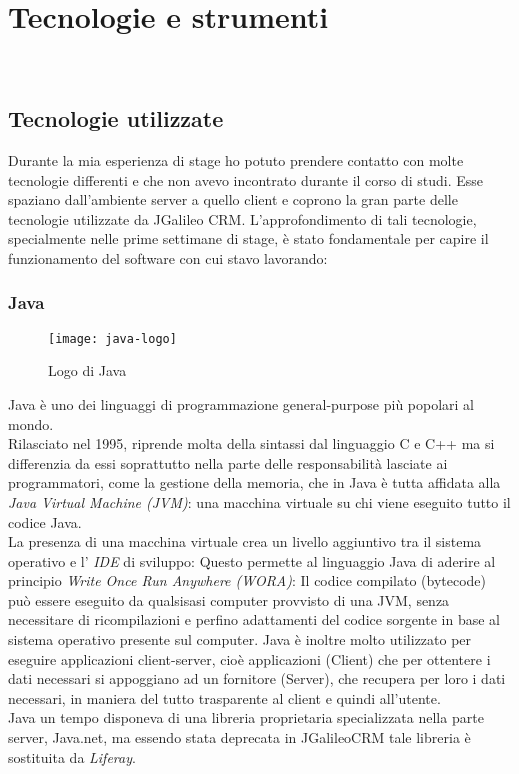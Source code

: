 \chapter{Tecnologie e strumenti}
\label{cap:tecnologie-strumenti}

\\

\section{Tecnologie utilizzate}
Durante la mia esperienza di stage ho potuto prendere contatto con molte tecnologie differenti e che non avevo incontrato durante il corso di studi. Esse spaziano dall'ambiente server a quello client e coprono la gran parte delle tecnologie utilizzate da JGalileo CRM. L'approfondimento di tali tecnologie, specialmente nelle prime settimane di stage, è stato fondamentale per capire il funzionamento del software con cui stavo lavorando: \\
\subsection{Java}
\begin{figure}[h]
	\centering
	\texttt{[image: java-logo]}
	\caption{Logo di Java}
\end{figure}
Java è uno dei linguaggi di programmazione general-purpose più popolari al mondo. \\
Rilasciato nel 1995, riprende molta della sintassi dal linguaggio C e C++ ma si differenzia da essi soprattutto  nella parte delle responsabilità lasciate ai programmatori, come la gestione della memoria, che in Java è tutta affidata alla \emph{Java Virtual Machine (JVM)}: una macchina virtuale su chi viene eseguito tutto il codice Java.\\
La presenza di una macchina virtuale crea un livello aggiuntivo tra il sistema operativo e l' \emph{IDE} di sviluppo: Questo permette al linguaggio Java di aderire al principio \emph{Write Once Run Anywhere (WORA)}: Il codice compilato (bytecode) può essere eseguito da qualsisasi computer provvisto di una JVM, senza necessitare di ricompilazioni e perfino adattamenti del codice sorgente in base al sistema operativo presente sul computer.
Java è inoltre molto utilizzato per eseguire applicazioni client-server, cioè applicazioni (Client) che per ottentere i dati necessari si appoggiano ad un fornitore (Server), che recupera per loro i dati necessari, in maniera del tutto trasparente al client e quindi all'utente.\\
Java un tempo disponeva di una libreria proprietaria specializzata nella parte server, Java.net, ma essendo stata deprecata in JGalileoCRM tale libreria è sostituita da \emph{Liferay}.\\
